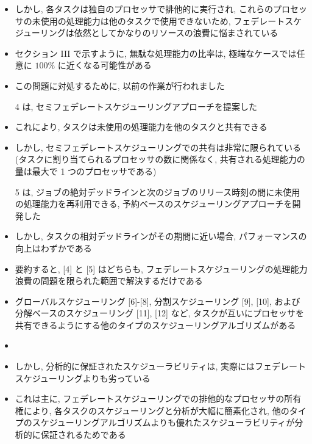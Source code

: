 \begin{frame}{}
    \begin{itemize}
        \item しかし, 各タスクは独自のプロセッサで排他的に実行され, これらのプロセッサの未使用の処理能力は他のタスクで使用できないため, フェデレートスケジューリングは依然としてかなりのリソースの浪費に悩まされている
\item セクション III で示すように, 無駄な処理能力の比率は, 極端なケースでは任意に $100 \%$ に近くなる可能性がある
\item この問題に対処するために, 以前の作業が行われました
\item [4] は, セミフェデレートスケジューリングアプローチを提案した
\item これにより, タスクは未使用の処理能力を他のタスクと共有できる
\item しかし, セミフェデレートスケジューリングでの共有は非常に限られている (タスクに割り当てられるプロセッサの数に関係なく, 共有される処理能力の量は最大で 1 つのプロセッサである)
\item [5] は, ジョブの絶対デッドラインと次のジョブのリリース時刻の間に未使用の処理能力を再利用できる, 予約ベースのスケジューリングアプローチを開発した
\item しかし, タスクの相対デッドラインがその期間に近い場合, パフォーマンスの向上はわずかである
\item 要約すると, [4] と [5] はどちらも, フェデレートスケジューリングの処理能力浪費の問題を限られた範囲で解決するだけである
    \end{itemize}
\end{frame}

\begin{frame}{}
    \begin{itemize}
        \item グローバルスケジューリング [6]-[8], 分割スケジューリング [9], [10], および分解ベースのスケジューリング [11], [12] など, タスクが互いにプロセッサを共有できるようにする他のタイプのスケジューリングアルゴリズムがある
\item
\item しかし, 分析的に保証されたスケジューラビリティは, 実際にはフェデレートスケジューリングよりも劣っている
\item これは主に, フェデレートスケジューリングでの排他的なプロセッサの所有権により, 各タスクのスケジューリングと分析が大幅に簡素化され, 他のタイプのスケジューリングアルゴリズムよりも優れたスケジューラビリティが分析的に保証されるためである
    \end{itemize}
\end{frame}

